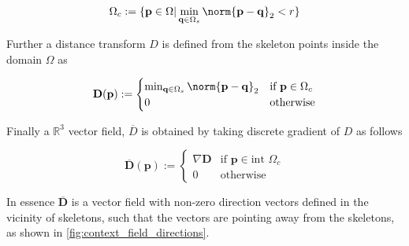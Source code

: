 \DeclarePairedDelimiter\norm\lVert\rVert

\begin{equation}
{\Omega}_c := \{ \mathbf{p} \in \Omega \vert \min_{\mathbf{q} \in \Omega_s} \norm{\mathbf{p} - \mathbf{q}}_2 < r \} 
\end{equation}

Further a distance transform $D$ is defined from the skeleton points inside the domain $\Omega$ as

\begin{equation}
\mathbf{D}(\mathbf{p}) := \begin{cases}
		\min_{\mathbf{q} \in \Omega_s} \norm{\mathbf{p}-\mathbf{q}}_2 & \text{if } \mathbf{p} \in \Omega_c \\
		0  & \text{otherwise}
		\end{cases} 
\end{equation}

Finally a $\mathbb{R}^3$ vector field, $\overline{D}$ is obtained by taking discrete gradient of $D$ as follows

\begin{equation}
 \overline{\mathbf{D}}(\mathbf{p}) := \begin{cases}
 \nabla \mathbf{D} & \text{if } \mathbf{p} \in \text{int } \Omega_c \\
 0  & \text{otherwise}
 \end{cases} 
\end{equation}
 
In essence $\overline{\mathbf{D}}$ is a vector field with non-zero direction vectors defined in the vicinity of skeletons, such that the vectors are pointing away from the skeletons, as shown in \autoref{fig:context_field_directions}.

